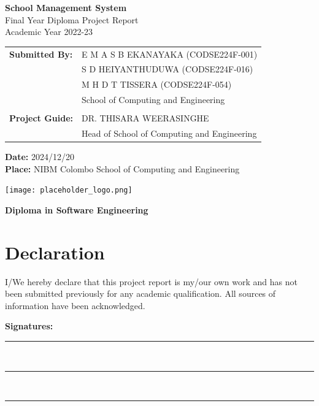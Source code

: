 \documentclass[12pt,a4paper]{report}
\begin{document}
\begin{titlepage}
    \centering
    \vspace*{2cm}
    {\Huge\bfseries School Management System\\[1.5em]}
    {\Large Final Year Diploma Project Report\\[1em]Academic Year 2022-23}
    \vspace{2cm}
    \begin{tabular}{ll}
        \textbf{Submitted By:} & E M A S B EKANAYAKA (CODSE224F-001) \\
        & S D HEIYANTHUDUWA (CODSE224F-016) \\
        & M H D T TISSERA (CODSE224F-054) \\
        & School of Computing and Engineering \\
        \\
        \textbf{Project Guide:} & DR. THISARA WEERASINGHE \\
        & Head of School of Computing and Engineering \\
    \end{tabular}
    
    \vfill
    \textbf{Date:} 2024/12/20\\
    \textbf{Place:} NIBM Colombo School of Computing and Engineering
    
    \vspace{1cm}
    \texttt{[image: placeholder\_logo.png]} %
    
    \vspace{1cm}
    \textbf{Diploma in Software Engineering}
\end{titlepage}

\newpage
\section*{Declaration}
I/We hereby declare that this project report is my/our own work and has not been submitted previously for any academic qualification. All sources of information have been acknowledged.

\vspace{2cm}
\noindent\textbf{Signatures:}

\vspace{2cm}
\noindent\rule{6cm}{0.4pt}\\
\noindent\rule{6cm}{0.4pt}\\
\noindent\rule{6cm}{0.4pt}
\end{document}

